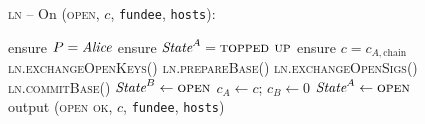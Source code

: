 \begin{figure}[H]
  \begin{processbox}{\textsc{ln} -- On (\textsc{open}, $c$, \texttt{fundee},
  \texttt{hosts}):}
    \begin{algorithmic}[1]
      \State {}
      \State ensure $P = \mathit{Alice}$ 
      \State ensure $\textit{State}^A = \textsc{topped up}$
      \State ensure $c = c_{A, \mathrm{chain}}$
      \State \textsc{ln.exchangeOpenKeys}()
      \State \textsc{ln.prepareBase}()
        \State \textsc{ln.exchangeOpenSigs}()
      \EndIf
        \State \textsc{ln.commitBase}()
       
        \State $\textit{State}^B \gets \textsc{open}$
      \EndIf
      \State $c_A \gets c$; $c_B \gets 0$
      \State $\textit{State}^A \gets \textsc{open}$
      \State output (\textsc{open ok}, $c$, \texttt{fundee}, \texttt{hosts})
    \end{algorithmic}
  \end{processbox}
  \caption{}
  \label{code:ln:open}
\end{figure}

